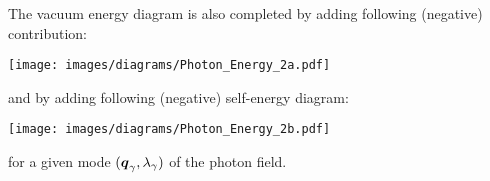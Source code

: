 The vacuum energy diagram is also completed by adding following (negative) contribution:
\begin{center}
\texttt{[image: images/diagrams/Photon\_Energy\_2a.pdf]}
\end{center}
and by adding following (negative) self-energy diagram:
\begin{center}
\texttt{[image: images/diagrams/Photon\_Energy\_2b.pdf]}
\end{center}
for a given mode $(\boldsymbol{q}_\gamma, \lambda_\gamma)$ of the photon field.

